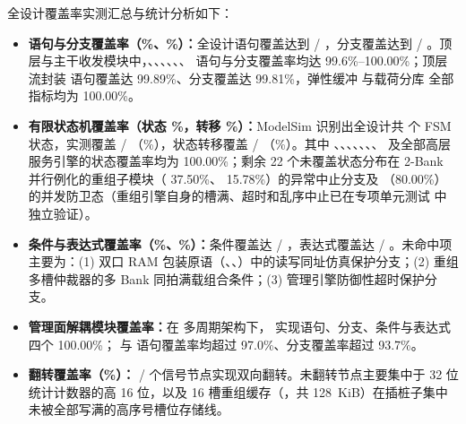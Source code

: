 全设计覆盖率实测汇总与统计分析如下：
\begin{itemize}[leftmargin=2em,itemsep=1pt,topsep=2pt,parsep=0pt]
  \item \textbf{语句与分支覆盖率（\CovStmt\%、\CovBranch\%）：}全设计语句覆盖达到 \CovStmtCov{} / \CovStmtTot{}，分支覆盖达到 \CovBranchCov{} / \CovBranchTot{}。顶层与主干收发模块中，、、、、、、 语句与分支覆盖率均达 99.6\%--100.00\%；顶层流封装  语句覆盖达 99.89\%、分支覆盖达 99.81\%，弹性缓冲  与载荷分库  全部指标均为 100.00\%。
  \item \textbf{有限状态机覆盖率（状态 \CovFsmState\%，转移 \CovFsmTrans\%）：}ModelSim 识别出全设计共 \CovFsmStateTot{} 个 FSM 状态，实测覆盖 \CovFsmStateCov{} / \CovFsmStateTot{}（\CovFsmState\%），状态转移覆盖 \CovFsmTransCov{} / \CovFsmTransTot{}（\CovFsmTrans\%）。其中 、、、、、、、 及全部高层服务引擎的状态覆盖率均为 100.00\%；剩余 22 个未覆盖状态分布在 2-Bank 并行例化的重组子模块（ 37.50\%、 15.78\%）的异常中止分支及 （80.00\%）的并发防卫态（重组引擎自身的槽满、超时和乱序中止已在专项单元测试  中独立验证）。
  \item \textbf{条件与表达式覆盖率（\CovCond\%、\CovExpr\%）：}条件覆盖达 \CovCondCov{} / \CovCondTot{}，表达式覆盖达 \CovExprCov{} / \CovExprTot{}。未命中项主要为：(1) 双口 RAM 包装原语（、、）中的读写同址仿真保护分支；(2) 重组多槽仲裁器的多 Bank 同拍满载组合条件；(3) 管理引擎防御性超时保护分支。
  \item \textbf{管理面解耦模块覆盖率：}在  多周期架构下， 实现语句、分支、条件与表达式四个 100.00\%； 与  语句覆盖率均超过 97.0\%、分支覆盖率超过 93.7\%。
  \item \textbf{翻转覆盖率（\CovToggle\%）：}\countsep{\CovToggleCov} / \countsep{\CovToggleTot} 个信号节点实现双向翻转。未翻转节点主要集中于  32 位统计计数器的高 16 位，以及 16 槽重组缓存（，共 128~KiB）在插桩子集中未被全部写满的高序号槽位存储线。
\end{itemize}
